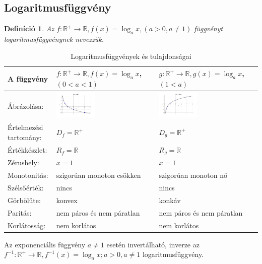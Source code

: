 \documentclass[12pt,a4paper]{article}
\newtheorem{definition}{Definíció} [section]
\begin{document}
\subsection{Logaritmusfüggvény}
\begin{definition}
Az $f:\mathbb{R}^+\rightarrow\mathbb{R}, f(x)=\log_ax, (a>0, a\neq 1)$  függvényt logaritmusfüggvénynek nevezzük.
\end{definition}

\begin{table}[h!]
\centering
\begin{tabular}{ | m{3cm} || m{6cm} | m{6cm} | }
A függvény & $f:\mathbb{R}^+\rightarrow\mathbb{R}, f(x)=\log_ax$,\newline $(0<a<1)$ & $g:\mathbb{R}^+\rightarrow\mathbb{R}, g(x)=\log_ax$,\newline $(1<a)$ \\
\hline
Ábrázolása: &\centering \includegraphics[width=0.4\textwidth]{chart/2021-10-31--12:59:11} & \includegraphics[width=0.4\textwidth]{chart/2021-10-31--13:00:36}\\
\hline
Értelmezési tartomány: & $D_f=\mathbb{R}^+$ & $D_g=\mathbb{R}^+$ \\
\hline
Értékkészlet: & $R_f=\mathbb{R}$ & $R_g=\mathbb{R}$\\
\hline
Zérushely: & $x = 1$& $x = 1$\\
\hline
Monotonitás: &szigorúan monoton csökken&szigorúan monoton nő \\
\hline
Szélsőérték: & nincs & nincs\\
\hline
Görbölüte: & konvex & konkáv\\
\hline
Paritás: & nem páros és nem páratlan & nem páros és nem páratlan \\
\hline
Korlátosság: & nem korlátos & nem korlátos \\
\end{tabular}
\caption{Logaritmusfüggvények és tulajdonságai}
\label{table:log_fugg}
\end{table}
Az exponenciális függvény $a\neq 1$ esetén invertálható, inverze az $f^{-1}:\mathbb{R}^+\rightarrow \mathbb{R}, f^{-1}(x)=\log_ax; a>0, a\neq 1$ logaritmusfüggvény.
\end{document}
